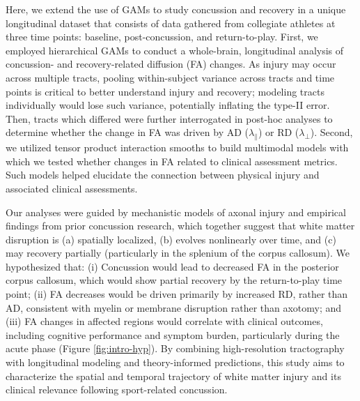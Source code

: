 \documentclass[12pt]{article}
\begin{document}
Here, we extend the use of GAMs to study concussion and recovery in a unique longitudinal dataset that consists of data gathered from collegiate athletes at three time points: baseline, post-concussion, and return-to-play. First, we employed hierarchical GAMs to conduct a whole-brain, longitudinal analysis of concussion- and recovery-related diffusion (FA) changes. As injury may occur across multiple tracts, pooling within-subject variance across tracts and time points is critical to better understand injury and recovery; modeling tracts individually would lose such variance, potentially inflating the type-II error. Then, tracts which differed were further interrogated in post-hoc analyses to determine whether the change in FA was driven by AD ($\lambda_\parallel$) or RD ($\lambda_\perp$). Second, we utilized tensor product interaction smooths to build multimodal models with which we tested whether changes in FA related to clinical assessment metrics. Such models helped elucidate the connection between physical injury and associated clinical assessments.

Our analyses were guided by mechanistic models of axonal injury and empirical findings from prior concussion research, which together suggest that white matter disruption is (a) spatially localized, (b) evolves nonlinearly over time, and (c) may recovery partially (particularly in the splenium of the corpus callosum). We hypothesized that: (i) Concussion would lead to decreased FA in the posterior corpus callosum, which would show partial recovery by the return-to-play time point; (ii) FA decreases would be driven primarily by increased RD, rather than AD, consistent with myelin or membrane disruption rather than axotomy; and (iii) FA changes in affected regions would correlate with clinical outcomes, including cognitive performance and symptom burden, particularly during the acute phase (Figure \ref{fig:intro-hyp}). By combining high-resolution tractography with longitudinal modeling and theory-informed predictions, this study aims to characterize the spatial and temporal trajectory of white matter injury and its clinical relevance following sport-related concussion.
\end{document}
